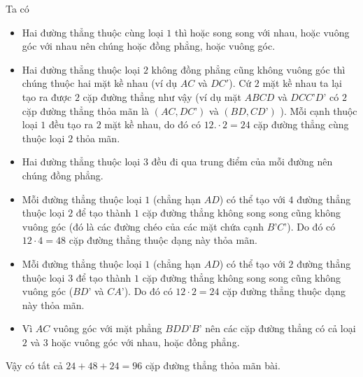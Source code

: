\begin{ex}
{{}
\noindent Ta có
\begin{itemize}
\item Hai đường thẳng thuộc cùng loại $1$ thì hoặc song song với nhau, hoặc vuông góc với nhau nên chúng hoặc đồng phẳng, hoặc vuông góc.
\item Hai đường thẳng thuộc loại $2$ không đồng phẳng cũng không vuông góc thì chúng thuộc hai mặt kề nhau (ví dụ $AC$ và $DC'$). Cứ $2$ mặt kề nhau ta lại tạo ra được $2$ cặp đường thẳng như
vậy (ví dụ mặt $ABCD$ và $DCC’D’$ có $2$ cặp đường thẳng thỏa mãn là $(AC, DC’)$ và $(BD,
CD’)$ ). Mỗi cạnh thuộc loại $1$ đều tạo ra $2$ mặt kề nhau, do đó có $12.\cdot 2=24$ cặp đường thẳng
cùng thuộc loại $2$ thỏa mãn.
\item Hai đường thẳng thuộc loại $3$ đều đi qua trung điểm của mỗi đường nên chúng đồng phẳng.
\item Mỗi đường thẳng thuộc loại $1$ (chẳng hạn $AD$) có thể tạo với $4$ đường thẳng thuộc loại $2$ để
tạo thành $1$ cặp đường thẳng không song song cũng không vuông góc (đó là các đường
chéo của các mặt chứa cạnh $B’C’$). Do đó có $12\cdot 4=48$ cặp đường thẳng thuộc dạng này
thỏa mãn.
\item Mỗi đường thẳng thuộc loại $1$ (chẳng hạn $AD$) có thể tạo với $2$ đường thẳng thuộc loại $3$ để
tạo thành $1$ cặp đường thẳng không song song cũng không vuông góc ($BD’$ và $CA’$). Do đó
có $12\cdot 2=24$ cặp đường thẳng thuộc dạng này thỏa mãn.
\item Vì $AC$ vuông góc với mặt phẳng $BDD’B’$ nên các cặp đường thẳng có cả loại $2$ và $3$ hoặc
vuông góc với nhau, hoặc đồng phẳng.
\end{itemize}
Vậy có tất cả $24+48+24=96$ cặp đường thẳng thỏa mãn bài.
}
\end{ex}

